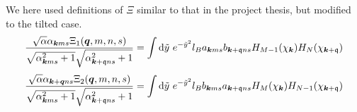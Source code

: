 We here used definitions of \( \Xi \) similar to that in the project thesis, but modified to the tilted case.
\begin{equation}
  \label{eq:30}
  \frac{ \sqrt{\alpha } \alpha _{\bm{k} m s} \Xi_1 ( \bm{q}, m, n, s )}{
    \sqrt{\alpha _{\bm{k} m s}^2 + 1}
    \sqrt{\alpha _{\bm{k} + \mathfrak{q} n s} ^2 + 1}
  }
  =
  \int \mathrm{d} \tilde{y}
  ~e^{-\tilde{y}^2}
  l_{B}
  a_{\bm{k} m s} b_{\bm{k} + \mathfrak{q} ns}
  H_{M-1} (\chi_{\bm{k}})
  H_N ( \chi _{\bm{k} + \mathfrak{q}} )
\end{equation}
\begin{equation}
  \label{eq:31}
  \frac{ \sqrt{\alpha } \alpha _{\bm{k} + \bm{q} n s} \Xi_2 ( \bm{q}, m, n, s )}{
    \sqrt{\alpha _{\bm{k} m s}^2 + 1}
    \sqrt{\alpha _{\bm{k} + \mathfrak{q} n s} ^2 + 1}
  }
  =
  \int \mathrm{d} \tilde{y}
  ~e^{-\tilde{y}^2}
  l_{B}
  b_{\bm{k} m s} a_{\bm{k} + \mathfrak{q} ns}
  H_{M} (\chi_{\bm{k}})
  H_{N-1} ( \chi _{\bm{k} + \mathfrak{q}} )
\end{equation}

